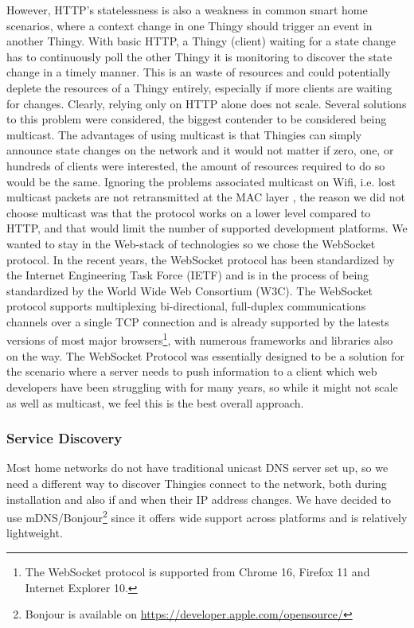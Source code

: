 \documentclass{ubicomp2012}
\begin{document}
However, HTTP's statelessness \cite{Fielding:1999:HTP:RFC2616} is also a weakness in common smart home scenarios, where a context change in one Thingy should trigger an event in another Thingy. With basic HTTP, a Thingy (client) waiting for a state change has to continuously poll the other Thingy it is monitoring to discover the state change in a timely manner. This is an waste of resources and could potentially deplete the resources of a Thingy entirely, especially if more clients are waiting for changes. Clearly, relying only on HTTP alone does not scale. Several solutions to this problem were considered, the biggest contender to be considered being multicast. The advantages of using multicast is that Thingies can simply announce state changes on the network and it would not matter if zero, one, or hundreds of clients were interested, the amount of resources required to do so would be the same. Ignoring the problems associated multicast on Wifi, i.e. lost multicast packets are not retransmitted at the MAC layer \cite{conf/icnp/ChandraKMNPRR09}, the reason we did not choose multicast was that the protocol works on a lower level compared to HTTP, and that would limit the number of supported development platforms. We wanted to stay in the Web-stack of technologies so we chose the WebSocket protocol. In the recent years, the WebSocket protocol has been standardized by the Internet Engineering Task Force (IETF)\cite{IETFWebsockets} and is in the process of being standardized by the World Wide Web Consortium (W3C)\cite{w3cWebsockets}. The WebSocket protocol supports multiplexing bi-directional, full-duplex communications channels over a single TCP connection and is already supported by the latests versions of most major browsers\footnote{The WebSocket protocol is supported from Chrome 16, Firefox 11 and Internet Explorer 10.}, with numerous frameworks and libraries also on the way. The WebSocket Protocol was essentially designed to be a solution for the scenario where a server needs to push information to a client\cite{IETFWebsockets} which web developers have been struggling with for many years, so while it might not scale as well as multicast, we feel this is the best overall approach.

\subsubsection{Service Discovery}
Most home networks do not have traditional unicast DNS server set up, so we need a different way to discover Thingies connect to the network, both during installation and also if and when their IP address changes. We have decided to use mDNS/Bonjour\footnote{Bonjour is available on \url{https://developer.apple.com/opensource/}} since it offers wide support across platforms and is relatively lightweight.
\end{document}
